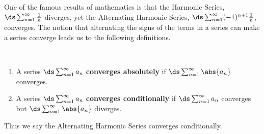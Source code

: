 One of the famous results of mathematics is that the Harmonic Series,\vspace{-.5\baselineskip} $\ds \sum_{n=1}^\infty \frac1n$ diverges, yet the Alternating Harmonic Series, $\ds \sum_{n=1}^\infty (-1)^{n+1}\frac1n$, converges. The notion that alternating the signs of the terms in a series can make a series converge leads us to the following definitions.

\begin{definition}\label{def:abs_converge}%
%
\mbox{}\\[-2\baselineskip]\parbox[t]{\linewidth}{%
\begin{enumerate}
	\item A series $\ds \sum_{n=1}^\infty a_n$ \textbf{converges absolutely} if $\ds \sum_{n=1}^\infty \abs{a_n}$ converges.
	\item A series $\ds \sum_{n=1}^\infty a_n$ \textbf{converges conditionally} if $\ds \sum_{n=1}^\infty a_n$ converges but $\ds \sum_{n=1}^\infty \abs{a_n}$ diverges.
\end{enumerate}}
\end{definition}


Thus we say the Alternating Harmonic Series converges conditionally.

